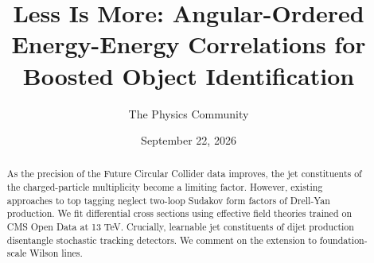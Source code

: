 \documentclass[11pt]{article}
\title{Less Is More: Angular-Ordered Energy-Energy Correlations for Boosted Object Identification}
\author{The Physics Community}
\date{September 22, 2026}
\numberwithin{equation}{section}
\theoremstyle{definition}
\theoremstyle{remark}
\begin{document}
\maketitle
\begin{abstract}
As the precision of the Future Circular Collider data improves, the jet
constituents of the charged-particle multiplicity become a limiting
factor. However, existing approaches to top tagging neglect two-loop
Sudakov form factors of Drell-Yan production. We fit differential cross
sections using effective field theories trained on CMS Open Data at 13
TeV. Crucially, learnable jet constituents of dijet production
disentangle stochastic tracking detectors. We comment on the extension
to foundation-scale Wilson lines.
\end{abstract}
\tableofcontents





\nocite{*}


\end{document}
